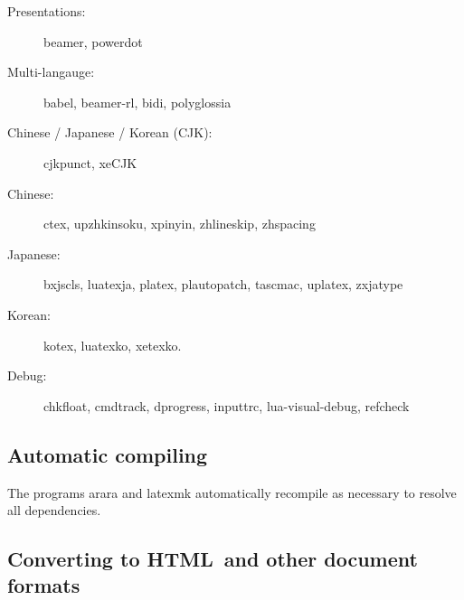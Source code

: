 \documentclass{article}
\def\HTML{\acro{HTML}}
\newcommand{\acro}[1]{\textsc{\MakeLowercase{#1}}}
\def\pkg#1{#1}%
\def\prog#1{\detokenize{#1}}%
\def\acro#1{#1}%
\def\HTML{HTML}%
\renewcommand*{\pkg}[1]{#1}
\renewcommand*{\prog}[1]{#1}
\begin{document}
\begin{multicols}{2}
\begin{description}
\item[Presentations:] \pkg{beamer}, \pkg{powerdot}

\item[Multi-langauge:] \pkg{babel}, \pkg{beamer-rl}, \pkg{bidi},
    \pkg{polyglossia}

\item[Chinese / Japanese / Korean (CJK):] \pkg{cjkpunct}, \pkg{xeCJK}

\item[Chinese:]
    \label{pkgs:chinese}
    \pkg{ctex}, \pkg{upzhkinsoku},
      \pkg{xpinyin}, \pkg{zhlineskip}, \pkg{zhspacing}


\item[Japanese:]
    \label{pkgs:japanese}
    \pkg{bxjscls}, \pkg{luatexja}, \pkg{platex},
    \pkg{plautopatch}, \pkg{tascmac}, \pkg{uplatex}, \pkg{zxjatype}


\item[Korean:]
    \label{pkgs:korean}
    \pkg{kotex}, \pkg{luatexko}, \pkg{xetexko}.

\item[Debug:] \pkg{chkfloat}, \pkg{cmdtrack}, \pkg{dprogress}, \pkg{inputtrc},
    \pkg{lua-visual-debug}, \pkg{refcheck}

\end{description}

\end{multicols}

\subsection{Automatic compiling}

The programs \prog{arara} and \prog{latexmk} automatically recompile as necessary to
resolve all dependencies.


\subsection{Converting to \HTML\ and other document formats}
\end{document}
